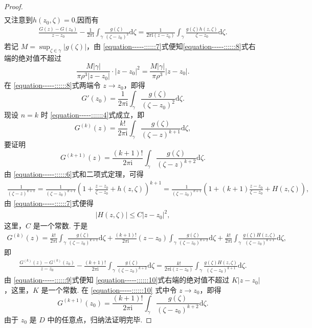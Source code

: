 \documentclass[../../main.tex]{subfiles}%
\begin{document}
\begin{proof}
\begin{align*}
\end{align*}
又注意到$h(z_0,\zeta)=0$,因而有
\begin{align}
\frac{G(z) - G(z_0)}{z - z_0} - \frac{1}{2\pi \mathrm{i}} \int_{\gamma} \frac{g(\zeta)}{(\zeta - z_0)^2} \mathrm{d}\zeta  = \frac{1}{2\pi \mathrm{i} (z - z_0)} \int_{\gamma} \frac{g(\zeta)h(z, \zeta)}{\zeta - z_0} \mathrm{d}\zeta. \label{equation-----::::::8}
\end{align}
若记 \( M = \sup_{\zeta \in \gamma} |g(\zeta)| \)，由 \eqref{equation-----::::::7}式便知\eqref{equation-----::::::8}式右端的绝对值不超过
\[
\frac{M |\gamma|}{\pi \rho^3 |z - z_0|} \cdot |z - z_0|^2 = \frac{M |\gamma|}{\pi \rho^3} |z - z_0|.
\]
在 \eqref{equation-----::::::8}式两端令 \( z \to z_0 \)，即得
\[
G'(z_0) = \frac{1}{2\pi \mathrm{i}} \int_{\gamma} \frac{g(\zeta)}{(\zeta - z_0)^2} \mathrm{d}\zeta.
\]
现设 \( n = k \) 时 \eqref{equation-----::::::4}式成立，即
\[
G^{(k)}(z) = \frac{k!}{2\pi \mathrm{i}} \int_{\gamma} \frac{g(\zeta)}{(\zeta - z)^{k + 1}} \mathrm{d}\zeta,
\]
要证明
\[
G^{(k + 1)}(z) = \frac{(k + 1)!}{2\pi \mathrm{i}} \int_{\gamma} \frac{g(\zeta)}{(\zeta - z)^{k + 2}} \mathrm{d}\zeta.
\]
由 \eqref{equation-----::::::6}式和二项式定理，可得
\begin{align*}
\frac{1}{(\zeta - z)^{k + 1}} = \frac{1}{(\zeta - z_0)^{k + 1}} \left( 1 + \frac{z - z_0}{\zeta - z_0} + h(z, \zeta) \right)^{k + 1} = \frac{1}{(\zeta - z_0)^{k + 1}} \left( 1 + (k + 1) \frac{z - z_0}{\zeta - z_0} + H(z, \zeta) \right),
\end{align*}
由 \eqref{equation-----::::::7}式便得
\begin{align}
|H(z, \zeta)| \leqslant C |z - z_0|^2, \label{equation-----::::::9}
\end{align}
这里，\( C \) 是一个常数. 于是
\begin{align*}
G^{(k)}(z) = \frac{k!}{2\pi \mathrm{i}} \int_{\gamma} \frac{g(\zeta)}{(\zeta - z_0)^{k + 1}} \mathrm{d}\zeta + \frac{(k + 1)!}{2\pi \mathrm{i}} (z - z_0) \int_{\gamma} \frac{g(\zeta)}{(\zeta - z_0)^{k + 2}} \mathrm{d}\zeta + \frac{k!}{2\pi \mathrm{i}} \int_{\gamma} \frac{g(\zeta)H(z, \zeta)}{(\zeta - z_0)^{k + 1}} \mathrm{d}\zeta,
\end{align*}
即
\begin{align}
\frac{G^{(k)}(z) - G^{(k)}(z_0)}{z - z_0} - \frac{(k + 1)!}{2\pi \mathrm{i}} \int_{\gamma} \frac{g(\zeta)}{(\zeta - z_0)^{k + 2}} \mathrm{d}\zeta = \frac{k!}{2\pi \mathrm{i} (z - z_0)} \int_{\gamma} \frac{g(\zeta)H(z, \zeta)}{(\zeta - z_0)^{k + 1}} \mathrm{d}\zeta. \label{equation-----::::::10}
\end{align}
由 \eqref{equation-----::::::9}式便知 \eqref{equation-----::::::10}式右端的绝对值不超过 \( K |z - z_0| \)，这里，\( K \) 是一个常数. 在 \eqref{equation-----::::::10} 式中令 \( z \to z_0 \)，即得
\[
G^{(k + 1)}(z_0) = \frac{(k + 1)!}{2\pi \mathrm{i}} \int_{\gamma} \frac{g(\zeta)}{(\zeta - z_0)^{k + 2}} \mathrm{d}\zeta.
\]
由于 \( z_0 \) 是 \( D \) 中的任意点，归纳法证明完毕. 
\end{proof}
\end{document}
